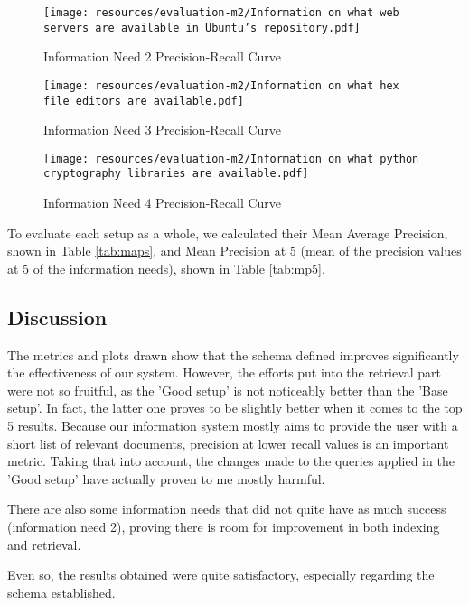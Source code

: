 \begin{figure}
    \centering
    \texttt{[image: resources/evaluation-m2/Information on what web servers are available in Ubuntu's repository.pdf]}
    \caption{Information Need 2 Precision-Recall Curve}
    \label{fig:info-need-2-prcurve}
\end{figure}

\begin{figure}
    \centering
    \texttt{[image: resources/evaluation-m2/Information on what hex file editors are available.pdf]}
    \caption{Information Need 3 Precision-Recall Curve}
    \label{fig:info-need-3-prcurve}
\end{figure}

\begin{figure}
    \centering
    \texttt{[image: resources/evaluation-m2/Information on what python cryptography libraries are available.pdf]}
    \caption{Information Need 4 Precision-Recall Curve}
    \label{fig:info-need-4-prcurve}
\end{figure}


To evaluate each setup as a whole, we calculated their Mean Average Precision, shown in Table \ref{tab:maps}, and Mean Precision at 5 (mean of the precision values at 5 of the information needs), shown in Table \ref{tab:mp5}.




\subsection{Discussion}

The metrics and plots drawn show that the schema defined improves significantly the effectiveness of our system. However, the efforts put into the retrieval part were not so fruitful, as the 'Good setup' is not noticeably better than the 'Base setup'. In fact, the latter one proves to be slightly better when it comes to the top 5 results. Because our information system mostly aims to provide the user with a short list of relevant documents, precision at lower recall values is an important metric. Taking that into account, the changes made to the queries applied in the 'Good setup' have actually proven to me mostly harmful. 

There are also some information needs that did not quite have as much success (information need 2), proving there is room for improvement in both indexing and retrieval.

Even so, the results obtained were quite satisfactory, especially regarding the schema established.